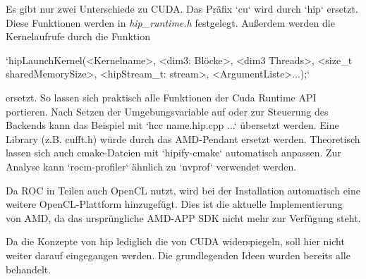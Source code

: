 	Es gibt nur zwei Unterschiede zu CUDA. Das Präfix \li`cu` wird durch \li`hip` ersetzt. Diese Funktionen werden in \textit{hip{\_}runtime.h} festgelegt. Außerdem werden die \Gls{Kernel}aufrufe durch die Funktion 
	
	\li`hipLaunchKernel(<Kernelname>, <dim3: Blöcke>, <dim3 Threads>, <size_t sharedMemorySize>, <hipStream_t: stream>, <ArgumentListe>...);` 
	
	ersetzt. So lassen sich praktisch alle Funktionen der Cuda Runtime \Gls{API} portieren. Nach Setzen der Umgebungsvariable auf oder zur Steuerung des Backends kann das Beispiel mit \li`hcc name.hip.cpp ...` übersetzt werden. Eine Library (z.B. cufft.h) würde durch das AMD-Pendant ersetzt werden. Theoretisch lassen sich auch cmake-Dateien mit \li`hipify-cmake` automatisch anpassen. Zur Analyse kann \li`rocm-profiler` ähnlich zu \li`nvprof` verwendet werden.
	
	Da ROC in Teilen auch OpenCL nutzt, wird bei der Installation automatisch eine weitere OpenCL-Plattform hinzugefügt. Dies ist die aktuelle Implementierung von AMD, da das ursprüngliche AMD-APP SDK nicht mehr zur Verfügung steht.
	
	Da die Konzepte von hip lediglich die von CUDA widerspiegeln, soll hier nicht weiter darauf eingegangen werden. Die grundlegenden Ideen wurden bereits alle behandelt.